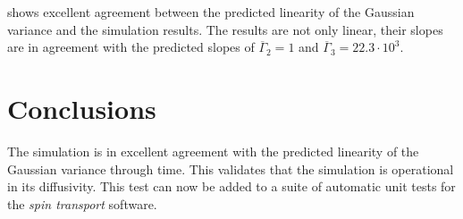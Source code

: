 \documentclass[onecolumn]{amsart}
\begin{document}
 shows excellent agreement between the predicted linearity of the Gaussian variance and the simulation results.
The results are not only linear, their slopes are in agreement with the predicted slopes of \(\overline{\Gamma}_2 = 1\) and \(\overline{\Gamma}_3 = 22.3\cdot 10^3\).

\section{Conclusions}
\label{sec:orgece42eb}

The simulation is in excellent agreement with the predicted linearity of the Gaussian variance through time.
This validates that the simulation is operational in its diffusivity.
This test can now be added to a suite of automatic unit tests for the \emph{spin transport} software.



\end{document}
